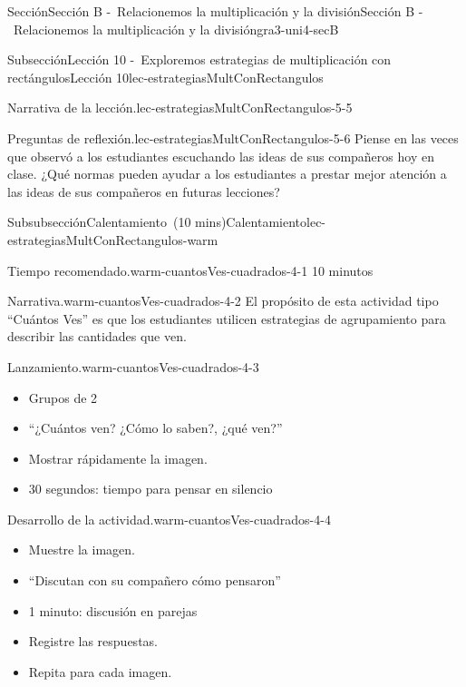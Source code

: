 \documentclass[oneside,10pt,]{article}
\begin{document}
\begin{sectionptx}{Sección}{Sección B -~Relacionemos la multiplicación y la división}{}{Sección B -~Relacionemos la multiplicación y la división}{}{}{gra3-uni4-secB}
\begin{subsectionptx}{Subsección}{Lección 10 -~Exploremos estrategias de multiplicación con rectángulos}{}{Lección 10}{}{}{lec-estrategiasMultConRectangulos}
\begin{introduction}{}
\begin{paragraphs}{Narrativa de la lección.}{lec-estrategiasMultConRectangulos-5-5}
\end{paragraphs}%
\begin{paragraphs}{Preguntas de reflexión.}{lec-estrategiasMultConRectangulos-5-6}%
Piense en las veces que observó a los estudiantes escuchando las ideas de sus compañeros hoy en clase. ¿Qué normas pueden ayudar a los estudiantes a prestar mejor atención a las ideas de sus compañeros en futuras lecciones?%
\end{paragraphs}%
\end{introduction}%
%
%
\typeout{************************************************}
\typeout{************************************************}
%
\begin{subsubsectionptx}{Subsubsección}{Calentamiento~(10 mins)}{}{Calentamiento}{}{}{lec-estrategiasMultConRectangulos-warm}
\par
\begin{paragraphs}{Tiempo recomendado.}{warm-cuantosVes-cuadrados-4-1}%
10 minutos%
\end{paragraphs}%
\begin{paragraphs}{Narrativa.}{warm-cuantosVes-cuadrados-4-2}%
El propósito de esta actividad tipo ``Cuántos Ves'' es que los estudiantes utilicen estrategias de agrupamiento para describir las cantidades que ven.%
\end{paragraphs}%
\begin{paragraphs}{Lanzamiento.}{warm-cuantosVes-cuadrados-4-3}%
%
\begin{itemize}[label=\textbullet]
\item{}Grupos de 2%
\item{}``¿Cuántos ven? ¿Cómo lo saben?, ¿qué ven?''%
\item{}Mostrar rápidamente la imagen.%
\item{}30 segundos: tiempo para pensar en silencio%
\end{itemize}
\end{paragraphs}%
\begin{paragraphs}{Desarrollo de la actividad.}{warm-cuantosVes-cuadrados-4-4}%
%
\begin{itemize}[label=\textbullet]
\item{}Muestre la imagen.%
\item{}``Discutan con su compañero cómo pensaron''%
\item{}1 minuto: discusión en parejas%
\item{}Registre las respuestas.%
\item{}Repita para cada imagen.%

\end{itemize}
\end{paragraphs}
\end{subsubsectionptx}
\end{subsectionptx}
\end{sectionptx}
\end{document}
